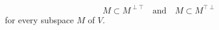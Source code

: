 $$M \subset M^{\perp \top} \quad \text{and} \quad M \subset M^{\top \perp}$$
for every subspace $M$ of $V$.
